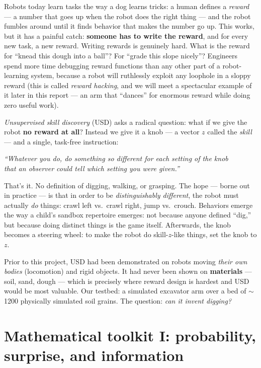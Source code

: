 \documentclass[11pt,a4paper]{article}
\begin{document}
Robots today learn tasks the way a dog learns tricks: a human defines a
\emph{reward} --- a number that goes up when the robot does the right thing ---
and the robot fumbles around until it finds behavior that makes the number go up.
This works, but it has a painful catch: \textbf{someone has to write the reward},
and for every new task, a new reward. Writing rewards is genuinely hard. What is
the reward for ``knead this dough into a ball''? For ``grade this slope nicely''?
Engineers spend more time debugging reward functions than any other part of a
robot-learning system, because a robot will ruthlessly exploit any loophole in a
sloppy reward (this is called \emph{reward hacking}, and we will meet a
spectacular example of it later in this report --- an arm that ``dances'' for
enormous reward while doing zero useful work).

\medskip
\emph{Unsupervised skill discovery} (USD) asks a radical question: what if we give
the robot \textbf{no reward at all}? Instead we give it a knob --- a vector $z$
called the \emph{skill} --- and a single, task-free instruction:

\begin{center}
\emph{``Whatever you do, do something so different for each setting of the knob\\
that an observer could tell which setting you were given.''}
\end{center}

That's it. No definition of digging, walking, or grasping. The hope --- borne out
in practice --- is that in order to be \emph{distinguishably different}, the robot
must actually \emph{do} things: crawl left vs.\ crawl right, jump vs.\ crouch.
Behaviors emerge the way a child's sandbox repertoire emerges: not because anyone
defined ``dig,'' but because doing distinct things is the game itself. Afterwards,
the knob becomes a steering wheel: to make the robot do skill-$z$-like things, set
the knob to $z$.

\medskip
Prior to this project, USD had been demonstrated on robots moving \emph{their own
bodies} (locomotion) and rigid objects. It had never been shown on
\textbf{materials} --- soil, sand, dough --- which is precisely where reward
design is hardest and USD would be most valuable. Our testbed: a simulated
excavator arm over a bed of $\sim$1200 physically simulated soil grains. The
question: \emph{can it invent digging?}

\section{Mathematical toolkit I: probability, surprise, and information}
\end{document}
